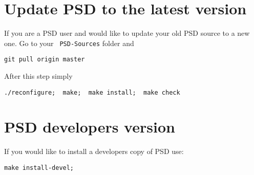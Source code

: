 \section{Update PSD to the latest version}

If you are a PSD user and would like to update your old PSD source to a new one. Go to your \lstinline[style=Linux]! PSD-Sources! folder and

\begin{lstlisting}[style=BashInputStyle]
git pull origin master
\end{lstlisting}

After this step simply

\begin{lstlisting}[style=BashInputStyle]
./reconfigure;  make;  make install;  make check
\end{lstlisting}

\section{PSD developers version}

If you would like to install  a developers copy  of PSD use:

\begin{lstlisting}[style=BashInputStyle]
make install-devel;
\end{lstlisting}
